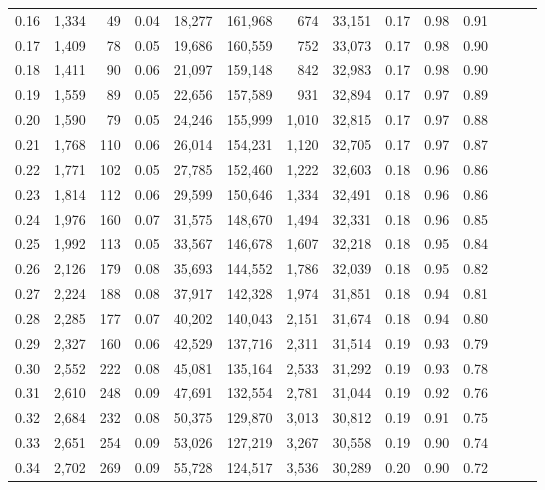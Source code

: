 \begin{tabular}{rrrrrrrrrrrrrr}
0.16 &  1,334 &     49 &  0.04 &   18,277 &  161,968 &     674 &  33,151 &  0.17 &  0.98 &      0.91 \\
0.17 &  1,409 &     78 &  0.05 &   19,686 &  160,559 &     752 &  33,073 &  0.17 &  0.98 &      0.90 \\
0.18 &  1,411 &     90 &  0.06 &   21,097 &  159,148 &     842 &  32,983 &  0.17 &  0.98 &      0.90 \\
0.19 &  1,559 &     89 &  0.05 &   22,656 &  157,589 &     931 &  32,894 &  0.17 &  0.97 &      0.89 \\
0.20 &  1,590 &     79 &  0.05 &   24,246 &  155,999 &   1,010 &  32,815 &  0.17 &  0.97 &      0.88 \\
0.21 &  1,768 &    110 &  0.06 &   26,014 &  154,231 &   1,120 &  32,705 &  0.17 &  0.97 &      0.87 \\
0.22 &  1,771 &    102 &  0.05 &   27,785 &  152,460 &   1,222 &  32,603 &  0.18 &  0.96 &      0.86 \\
0.23 &  1,814 &    112 &  0.06 &   29,599 &  150,646 &   1,334 &  32,491 &  0.18 &  0.96 &      0.86 \\
0.24 &  1,976 &    160 &  0.07 &   31,575 &  148,670 &   1,494 &  32,331 &  0.18 &  0.96 &      0.85 \\
0.25 &  1,992 &    113 &  0.05 &   33,567 &  146,678 &   1,607 &  32,218 &  0.18 &  0.95 &      0.84 \\
0.26 &  2,126 &    179 &  0.08 &   35,693 &  144,552 &   1,786 &  32,039 &  0.18 &  0.95 &      0.82 \\
0.27 &  2,224 &    188 &  0.08 &   37,917 &  142,328 &   1,974 &  31,851 &  0.18 &  0.94 &      0.81 \\
0.28 &  2,285 &    177 &  0.07 &   40,202 &  140,043 &   2,151 &  31,674 &  0.18 &  0.94 &      0.80 \\
0.29 &  2,327 &    160 &  0.06 &   42,529 &  137,716 &   2,311 &  31,514 &  0.19 &  0.93 &      0.79 \\
0.30 &  2,552 &    222 &  0.08 &   45,081 &  135,164 &   2,533 &  31,292 &  0.19 &  0.93 &      0.78 \\
0.31 &  2,610 &    248 &  0.09 &   47,691 &  132,554 &   2,781 &  31,044 &  0.19 &  0.92 &      0.76 \\
0.32 &  2,684 &    232 &  0.08 &   50,375 &  129,870 &   3,013 &  30,812 &  0.19 &  0.91 &      0.75 \\
0.33 &  2,651 &    254 &  0.09 &   53,026 &  127,219 &   3,267 &  30,558 &  0.19 &  0.90 &      0.74 \\
0.34 &  2,702 &    269 &  0.09 &   55,728 &  124,517 &   3,536 &  30,289 &  0.20 &  0.90 &      0.72 \\

\end{tabular}
